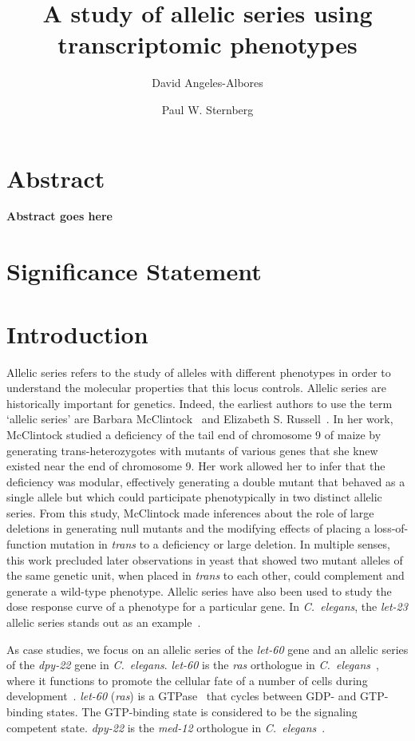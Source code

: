 \documentclass[10pt, onecolumn]{article}
\title{A study of allelic series using transcriptomic phenotypes}
\author[1,2]{David Angeles-Albores}
\author[1,2,*]{Paul W. Sternberg}
\affil[1]{Division of Biology and Biological Engineering, Caltech,
Pasadena, CA, 91125, USA}
\affil[2]{Howard Hughes Medical Institute, Caltech, Pasadena, CA, 91125, USA}
\affil[*]{Corresponding author. Contact: pws@caltech.edu}
\newcommand{\cel}{\emph{C.~elegans}}
\newcommand{\gene}[1]{\mbox{\emph{#1}}}
\newcommand{\ras}{\gene{let-60} (\emph{ras})}
\begin{document}
\maketitle

\section*{Abstract}

\textbf{
Abstract goes here
}

\vspace{10mm}

\section*{Significance Statement}


\vspace{10mm}

\linenumbers{}

\section*{Introduction}
Allelic series refers to the study of alleles with different phenotypes in order
to understand the molecular properties that this locus controls. Allelic series
are historically important for genetics. Indeed, the earliest authors to use the
term `allelic series' are Barbara McClintock~\cite{} and Elizabeth S.
Russell~\cite{}. In her work, McClintock studied a deficiency of the tail end of
chromosome 9 of maize by generating trans-heterozygotes with mutants of various
genes that she knew existed near the end of chromosome 9. Her work allowed her
to infer that the deficiency was modular, effectively generating a double mutant
that behaved as a single allele but which could participate phenotypically in
two distinct allelic series. From this study, McClintock made inferences about
the role of large deletions in generating null mutants and the modifying effects
of placing a loss-of-function mutation in \emph{trans} to a deficiency or large
deletion. In multiple senses, this work precluded later observations in yeast
that showed two mutant alleles of the same genetic unit, when placed in
\emph{trans} to each other, could complement and generate a wild-type phenotype.
Allelic series have also been used to study the dose response curve of a
phenotype for a particular gene. In \cel{}, the \gene{let-23} allelic series
stands out as an example~\cite{}.

As case studies, we focus on an allelic series of the \gene{let-60} gene and an
allelic series of the \gene{dpy-22} gene in \cel{}. \gene{let-60} is the
\gene{ras} orthologue in \cel{}~\cite{Han1990a}, where it functions to promote
the cellular fate of a number of cells during development~\cite{Yochem1997}.
\ras{} is a GTPase~\cite{Han1990a} that cycles between GDP- and GTP-binding
states. The GTP-binding state is considered to be the signaling
competent state. \gene{dpy-22} is the \gene{med-12} orthologue in
\cel{}~\cite{}.
\end{document}
